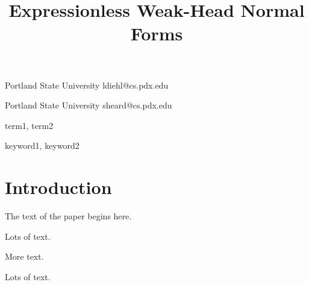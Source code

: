 \documentclass[preprint,authoryear]{sigplanconf}
\begin{document}
\setlength{\pdfpageheight}{\paperheight}
\setlength{\pdfpagewidth}{\paperwidth}






\title{Expressionless Weak-Head Normal Forms}

           {Portland State University}
           {ldiehl@cs.pdx.edu}

           {Portland State University}
           {sheard@cs.pdx.edu}

\maketitle

\begin{abstract}
\lipsum[2-3]
\end{abstract}


\terms
term1, term2

\keywords
keyword1, keyword2

\section{Introduction}

The text of the paper begins here.

Lots of text.

More text.

Lots of text.
\end{document}
